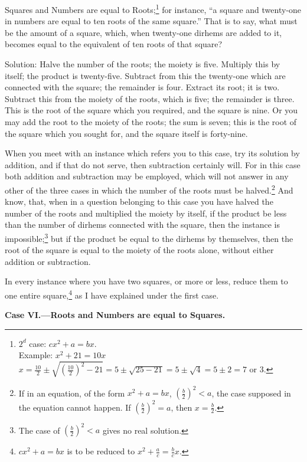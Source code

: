 Squares and Numbers are equal to Roots;\footnote{$2^{d}$ case: $cx^2 + a = bx$.\\Example: $x^2 + 21 = 10x$\\$x = \frac{10}{2} \pm \sqrt{(\frac{10}{2})^2 - 21} = 5 \pm \sqrt{25 - 21} = 5 \pm \sqrt{4} = 5 \pm 2 = 7$ or $3$.} for instance, ``a square and twenty-one in numbers are equal to ten roots of the same square.'' That is to say, what must be the amount of a square, which, when twenty-one dirhems are added to it, becomes equal to the equivalent of ten roots of that square?

Solution: Halve the number of the roots; the moiety is five. Multiply this by itself; the product is twenty-five. Subtract from this the twenty-one which are connected with the square; the remainder is four. Extract its root; it is two. Subtract this from the moiety of the roots, which is five; the remainder is three. This is the root of the square which you required, and the square is nine. Or you may add the root to the moiety of the roots; the sum is seven; this is the root of the square which you sought for, and the square itself is forty-nine.

When you meet with an instance which refers you to this case, try its solution by addition, and if that do not serve, then subtraction certainly will. For in this case both addition and subtraction may be employed, which will not answer in any other of the three cases in which the number of the roots must be halved.\footnote{If in an equation, of the form $x^2 + a = bx$, $(\frac{b}{2})^2 < a$, the case supposed in the equation cannot happen. If $(\frac{b}{2})^2 = a$, then $x = \frac{b}{2}$.} And know, that, when in a question belonging to this case you have halved the number of the roots and multiplied the moiety by itself, if the product be less than the number of dirhems connected with the square, then the instance is impossible;\footnote{The case of $(\frac{b}{2})^2 < a$ gives no real solution.} but if the product be equal to the dirhems by themselves, then the root of the square is equal to the moiety of the roots alone, without either addition or subtraction.

In every instance where you have two squares, or more or less, reduce them to one entire square,\footnote{$cx^2 + a = bx$ is to be reduced to $x^2 + \frac{a}{c} = \frac{b}{c}x$.} as I have explained under the first case.

\vspace{0.3cm}
\noindent\textbf{Case VI.---Roots and Numbers are equal to Squares.}

